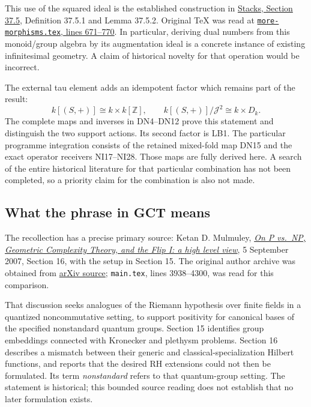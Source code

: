\documentclass[
]{article}
\begin{document}
This use of the squared ideal is the established construction in
\href{https://stacks.math.columbia.edu/tag/05YW}{Stacks, Section 37.5},
Definition 37.5.1 and Lemma 37.5.2. Original TeX was read at
\href{https://github.com/stacks/stacks-project/blob/a04446e57ec1fbc252a871afcec7752fb2807b14/more-morphisms.tex\#L671}{\texttt{more-morphisms.tex},
lines 671--770}. In particular, deriving dual numbers from this
monoid/group algebra by its augmentation ideal is a concrete instance of
existing infinitesimal geometry. A claim of historical novelty for that
operation would be incorrect.

The external tau element adds an idempotent factor which remains part of
the result: \[
k[(S,+)]\cong k\times k[\mathbb Z],\qquad
k[(S,+)]/\mathcal J^2\cong k\times D_k.
\tag{LB2}
\] The complete maps and inverses in DN4--DN12 prove this statement and
distinguish the two support actions. Its second factor is LB1. The
particular programme integration consists of the retained mixed-fold map
DN15 and the exact operator receivers NI17--NI28. Those maps are fully
derived here. A search of the entire historical literature for that
particular combination has not been completed, so a priority claim for
the combination is also not made.

\subsection{What the phrase in GCT
means}\label{what-the-phrase-in-gct-means}

The recollection has a precise primary source: Ketan D. Mulmuley,
\href{https://arxiv.org/abs/0709.0748v1}{\emph{On P vs.~NP, Geometric
Complexity Theory, and the Flip I: a high level view}}, 5 September
2007, Section 16, with the setup in Section 15. The original author
archive was obtained from \href{https://arxiv.org/src/0709.0748v1}{arXiv
source}; \texttt{main.tex}, lines 3938--4300, was read for this
comparison.

That discussion seeks analogues of the Riemann hypothesis over finite
fields in a quantized noncommutative setting, to support positivity for
canonical bases of the specified nonstandard quantum groups. Section 15
identifies group embeddings connected with Kronecker and plethysm
problems. Section 16 describes a mismatch between their generic and
classical-specialization Hilbert functions, and reports that the desired
RH extensions could not then be formulated. Its term \emph{nonstandard}
refers to that quantum-group setting. The statement is historical; this
bounded source reading does not establish that no later formulation
exists.
\end{document}
